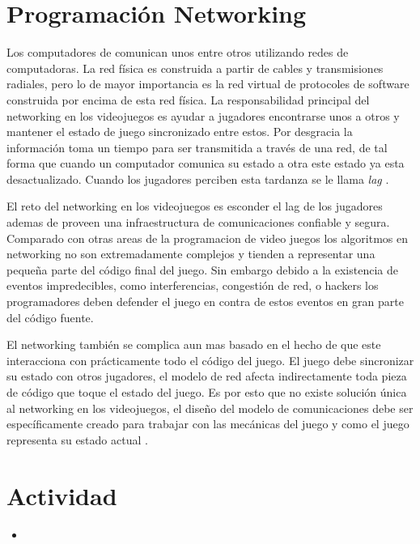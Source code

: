 \section{Programación Networking}
Los computadores de comunican unos entre otros utilizando redes de computadoras. La red física es construida a partir de cables y transmisiones radiales, pero lo de mayor importancia es la red virtual de protocoles de software construida por encima de esta red física. La responsabilidad principal del networking en los videojuegos es ayudar a jugadores encontrarse unos a otros y mantener el estado de juego sincronizado entre estos. Por desgracia la información toma un tiempo para ser transmitida a través de una red, de tal forma que cuando un computador comunica su estado a otra este estado ya esta desactualizado. Cuando los jugadores perciben esta tardanza se le llama \emph{lag} \cite[p.~356]{jenkinscreatinggames}.

El reto del networking en los videojuegos es esconder el lag de los jugadores ademas de proveen una infraestructura de comunicaciones confiable y segura. Comparado con otras areas de la programacion de video juegos los algoritmos en networking no son extremadamente complejos y tienden a representar una pequeña parte del código final del juego. Sin embargo debido a la existencia de eventos impredecibles, como interferencias, congestión de red, o hackers los programadores deben defender el juego en contra de estos eventos en gran parte del código fuente.

El networking también se complica aun mas basado en el hecho de que este interacciona con prácticamente todo el código del juego. El juego debe sincronizar su estado con otros jugadores, el modelo de red afecta indirectamente toda pieza de código que toque el estado del juego. Es por esto que no existe solución única al networking en los videojuegos, el diseño del modelo de comunicaciones debe ser específicamente creado para trabajar con las mecánicas del juego y como el juego representa su estado actual \cite{netaoe}.
\section{Actividad}
\begin{itemize}
\item {}
\end{itemize}